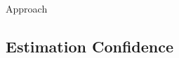 \begin{section}{Approach}



	

\subsection{Estimation Confidence} 

\label{sec:estimation_confidence}


\end{section}
